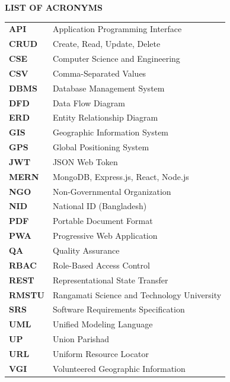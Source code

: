 
\clearpage
\thispagestyle{frontmatter}
{}

\begin{center}
    {\Large\bfseries LIST OF ACRONYMS}
\end{center}

\vspace{0.8cm}

\begin{longtable}{@{}p{2.5cm}p{12cm}@{}}
    \textbf{API}    & Application Programming Interface \\[4pt]
    \textbf{CRUD}   & Create, Read, Update, Delete \\[4pt]
    \textbf{CSE}    & Computer Science and Engineering \\[4pt]
    \textbf{CSV}    & Comma-Separated Values \\[4pt]
    \textbf{DBMS}   & Database Management System \\[4pt]
    \textbf{DFD}    & Data Flow Diagram \\[4pt]
    \textbf{ERD}    & Entity Relationship Diagram \\[4pt]
    \textbf{GIS}    & Geographic Information System \\[4pt]
    \textbf{GPS}    & Global Positioning System \\[4pt]
    \textbf{JWT}    & JSON Web Token \\[4pt]
    \textbf{MERN}   & MongoDB, Express.js, React, Node.js \\[4pt]
    \textbf{NGO}    & Non-Governmental Organization \\[4pt]
    \textbf{NID}    & National ID (Bangladesh) \\[4pt]
    \textbf{PDF}    & Portable Document Format \\[4pt]
    \textbf{PWA}    & Progressive Web Application \\[4pt]
    \textbf{QA}     & Quality Assurance \\[4pt]
    \textbf{RBAC}   & Role-Based Access Control \\[4pt]
    \textbf{REST}   & Representational State Transfer \\[4pt]
    \textbf{RMSTU}  & Rangamati Science and Technology University \\[4pt]
    \textbf{SRS}    & Software Requirements Specification \\[4pt]
    \textbf{UML}    & Unified Modeling Language \\[4pt]
    \textbf{UP}     & Union Parishad \\[4pt]
    \textbf{URL}    & Uniform Resource Locator \\[4pt]
    \textbf{VGI}    & Volunteered Geographic Information \\[4pt]
\end{longtable}

